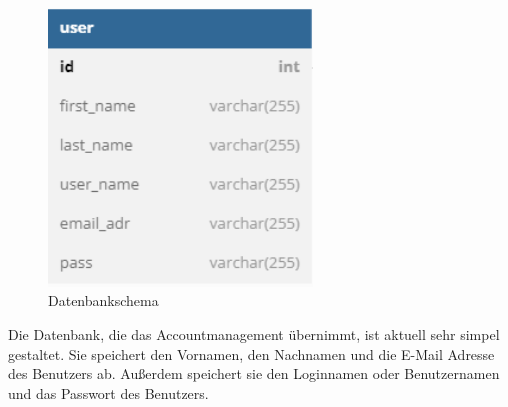 \begin{figure}[h]
	\centering
	\includegraphics[width=7cm]{images/DatabaseSchemeCurrent.png}
	\caption[Datenbankschema]{Datenbankschema}
	\label{fig:Datenbankschema}
\end{figure}
Die Datenbank, die das Accountmanagement übernimmt, ist aktuell sehr simpel gestaltet. Sie speichert den Vornamen, den Nachnamen und die E-Mail Adresse des Benutzers ab. Außerdem speichert sie den Loginnamen oder Benutzernamen und das Passwort des Benutzers.
